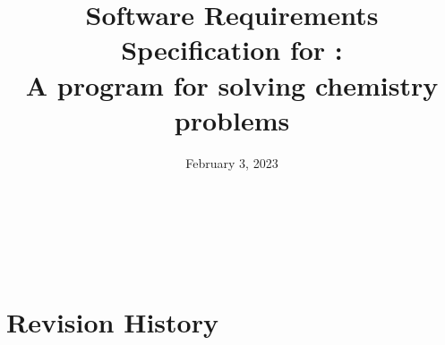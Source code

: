 \documentclass[12pt]{article}
\begin{document}
\title{Software Requirements Specification for \progname:\\
  A program for solving chemistry problems}
\author{\authname}
\date{February 3, 2023}

\maketitle
\thispagestyle{empty}

~\newpage


\tableofcontents

~\newpage

\section*{Revision History} \label{sec_revHist}
\end{document}
